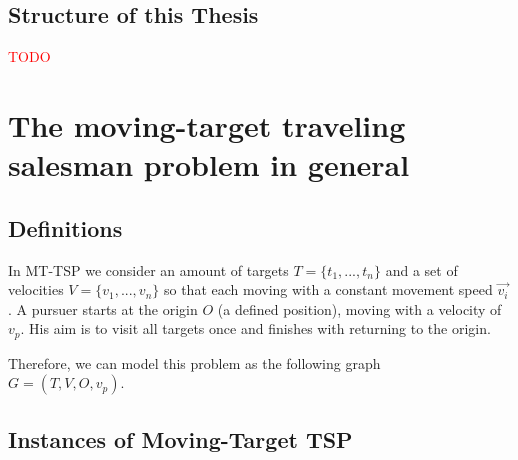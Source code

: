 \documentclass[english,version-2019-07]{uzl-thesis}
\begin{document}
\section{Structure of this Thesis}


%

\textcolor{red}{TODO}




%

\chapter{The moving-target traveling salesman problem in general}
\section{Definitions}
In MT-TSP we consider an amount of targets $T=\{t_1,...,t_n\}$ and a set of velocities $V=\{v_1,...,v_n\}$ so that each moving with a constant movement speed $\overrightarrow{v_i}$. A pursuer starts at the origin $O$ (a defined position), moving with a velocity of $v_p$. His aim is to visit all targets once and finishes with returning to the origin.

Therefore, we can model this problem as the following graph \\
$G=(T, V, O, v_p)$. 

\section{Instances of Moving-Target TSP}
\end{document}
